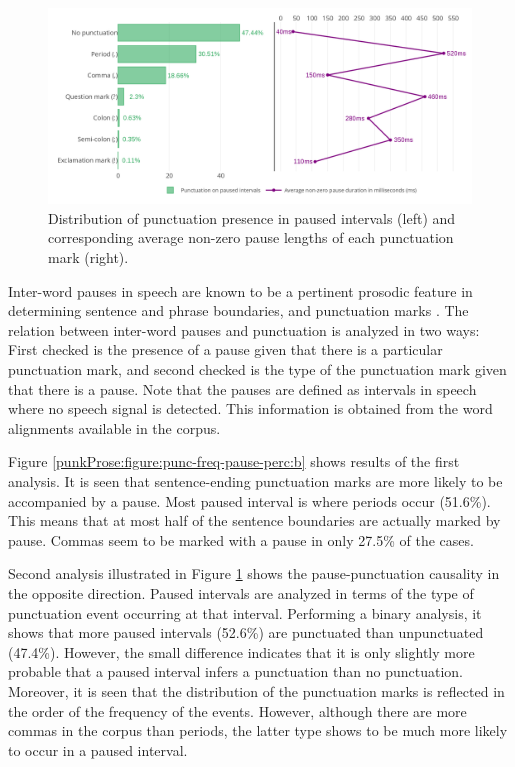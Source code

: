 \begin{figure}[h]
\centering\includegraphics[width=\linewidth]{img/3-pause-events.png}
\caption{Distribution of punctuation presence in paused intervals (left) and corresponding average non-zero pause lengths of each punctuation mark (right).}
\label{punkProse:figure:punc-freq-pause-perc:c}
\end{figure}

Inter-word pauses in speech are known to be a pertinent prosodic feature in determining sentence and phrase boundaries, and punctuation marks \citep{Psutka04automaticpunctuation, Christensen01punctuationannotation}. The relation between inter-word pauses and punctuation is analyzed in two ways: First checked is the presence of a pause given that there is a particular punctuation mark, and second checked is the type of the punctuation mark given that there is a pause. Note that the pauses are defined as intervals in speech where no speech signal is detected. This information is obtained from the word alignments available in the corpus. 

Figure \ref{punkProse:figure:punc-freq-pause-perc:b} shows results of the first analysis. It is seen that sentence-ending punctuation marks are more likely to be accompanied by a pause. Most paused interval is where periods occur (51.6\%). This means that at most half of the sentence boundaries are actually marked by pause. Commas seem to be marked with a pause in only 27.5\% of the cases. 

Second analysis illustrated in Figure \ref{punkProse:figure:punc-freq-pause-perc:c} shows the pause-punctuation causality in the opposite direction. Paused intervals are analyzed in terms of the type of punctuation event occurring at that interval. Performing a binary analysis, it shows that more paused intervals (52.6\%) are punctuated than unpunctuated (47.4\%). However, the small difference indicates that it is only slightly more probable that a paused interval infers a punctuation than no punctuation. Moreover, it is seen that the distribution of the punctuation marks is reflected in the order of the frequency of the events. However, although there are more commas in the corpus than periods, the latter type shows to be much more likely to occur in a paused interval. 

